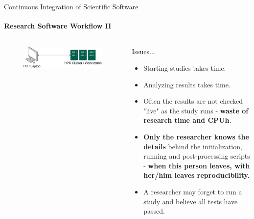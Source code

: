 \begin{frame}{Continuous Integration of Scientific Software}
    \framesubtitle{Research Software Workflow II} 
    \vfill

    \begin{columns}
        \begin{column}[c]{0.5\textwidth}
            \begin{figure}
                \centering
                \includegraphics[width=\columnwidth]{figures/workflow-overview.png}
            \end{figure}
        \end{column}
        \begin{column}[c]{0.5\textwidth}
            Issues...
            \begin{itemize}
                \item Starting studies takes time. 
                \item Analyzing results takes time. 
                \item Often the results are not checked "live" as the study runs - \textbf{waste of research time and CPUh}. 
                \item \textbf{Only the researcher knows the details} behind the initialization, running and post-processing scripts - \textbf{when this person leaves, with her/him leaves reproducibility.} 
                \item A researcher may forget to run a study and believe all tests have passed.
            \end{itemize}
        \end{column}
    \end{columns}


\end{frame}


